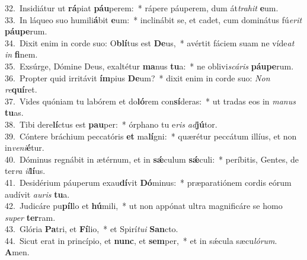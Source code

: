 {32.~}Insidiátur ut \textbf{rá}piat \textbf{páu}perem:~* rápere páuperem, dum át\textit{tra}\textit{hit} \textbf{e}um.\\
{33.~}In láqueo suo humili\textbf{á}bit \textbf{e}um:~* inclinábit se, et cadet, cum dominátus fú\textit{e}\textit{rit} \textbf{páu}\textbf{pe}rum.\\
{34.~}Dixit enim in corde suo: O\textbf{blí}tus est \textbf{De}us,~* avértit fáciem suam ne víde\textit{at} \textit{in} \textbf{fi}nem.\\
{35.~}Exsúrge, Dómine Deus, exaltétur \textbf{ma}nus \textbf{tu}a:~* ne oblivi\textit{scá}\textit{ris} \textbf{páu}\textbf{pe}rum.\\
{36.~}Propter quid irritávit \textbf{ím}pius \textbf{De}um?~* dixit enim in corde suo: \textit{Non} \textit{re}\textbf{quí}ret.\\
{37.~}Vides quóniam tu labórem et do\textbf{ló}rem con\textbf{sí}deras:~* ut tradas eos in \textit{ma}\textit{nus} \textbf{tu}as.\\
{38.~}Tibi dere\textbf{lí}ctus est \textbf{pau}per:~* órphano tu e\textit{ris} \textit{ad}\textbf{jú}tor.\\
{39.~}Cóntere bráchium peccatóris \textbf{et} ma\textbf{lí}gni:~* quærétur peccátum illíus, et non in\textit{ve}\textit{ni}\textbf{é}tur.\\
{40.~}Dóminus regnábit in ætérnum, et in \textbf{sǽ}culum \textbf{sǽ}culi:~* períbitis, Gentes, de ter\textit{ra} \textit{il}\textbf{lí}us.\\
{41.~}Desidérium páuperum exau\textbf{dí}vit \textbf{Dó}minus:~* præparatiónem cordis eórum audívit \textit{au}\textit{ris} \textbf{tu}a.\\
{42.~}Judicáre pu\textbf{píl}lo et \textbf{hú}mili,~* ut non appónat ultra magnificáre se homo \textit{su}\textit{per} \textbf{ter}ram.\\
{43.~}Glória \textbf{Pa}tri, et \textbf{Fí}lio,~* et Spirí\textit{tu}\textit{i} \textbf{San}cto.\\
{44.~}Sicut erat in princípio, et \textbf{nunc}, et \textbf{sem}per,~* et in sǽcula sæcu\textit{ló}\textit{rum}. \textbf{A}men.\\
